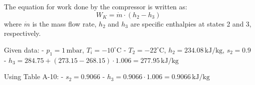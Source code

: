 The equation for work done by the compressor is written as:  
\[
W_K = \dot{m} \cdot (h_2 - h_3)
\]  
where \( \dot{m} \) is the mass flow rate, \( h_2 \) and \( h_3 \) are specific enthalpies at states 2 and 3, respectively.  

Given data:  
- \( p_1 = 1 \, \text{mbar} \), \( T_i = -10^\circ\text{C} \)  
- \( T_2 = -22^\circ\text{C} \), \( h_2 = 234.08 \, \text{kJ/kg} \), \( s_2 = 0.9 \)  
- \( h_3 = 284.75 + (273.15 - 268.15) \cdot 1.006 = 277.95 \, \text{kJ/kg} \)  

Using Table A-10:  
- \( s_2 = 0.9066 \)  
- \( h_3 = 0.9066 \cdot 1.006 = 0.9066 \, \text{kJ/kg} \)
